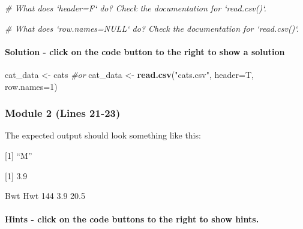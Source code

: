\documentclass[
]{article}
\newenvironment{Shaded}{\begin{snugshade}}{\end{snugshade}}
\newcommand{\CommentTok}[1]{\textcolor[rgb]{0.56,0.35,0.01}{\textit{#1}}}
\newcommand{\DataTypeTok}[1]{\textcolor[rgb]{0.13,0.29,0.53}{#1}}
\newcommand{\DecValTok}[1]{\textcolor[rgb]{0.00,0.00,0.81}{#1}}
\newcommand{\KeywordTok}[1]{\textcolor[rgb]{0.13,0.29,0.53}{\textbf{#1}}}
\newcommand{\NormalTok}[1]{#1}
\newcommand{\StringTok}[1]{\textcolor[rgb]{0.31,0.60,0.02}{#1}}
\begin{document}
\begin{Shaded}
\begin{Highlighting}[]
\CommentTok{# What does `header=F` do? Check the documentation for `read.csv()`.}
\end{Highlighting}
\end{Shaded}

\begin{Shaded}
\begin{Highlighting}[]
\CommentTok{# What does `row.names=NULL` do? Check the documentation for `read.csv()`.}
\end{Highlighting}
\end{Shaded}

\hypertarget{solution---click-on-the-code-button-to-the-right-to-show-a-solution}{%
\paragraph{Solution - click on the code button to the right to show a
solution}\label{solution---click-on-the-code-button-to-the-right-to-show-a-solution}}

\begin{Shaded}
\begin{Highlighting}[]
\NormalTok{cat_data <-}\StringTok{ }\NormalTok{cats }\CommentTok{#or}
\NormalTok{cat_data <-}\StringTok{ }\KeywordTok{read.csv}\NormalTok{(}\StringTok{"cats.csv"}\NormalTok{, }\DataTypeTok{header=}\NormalTok{T, }\DataTypeTok{row.names=}\DecValTok{1}\NormalTok{)}
\end{Highlighting}
\end{Shaded}

\hypertarget{module-2-lines-21-23}{%
\subsubsection{Module 2 (Lines 21-23)}\label{module-2-lines-21-23}}

The expected output should look something like this:

{[}1{]} ``M''

{[}1{]} 3.9

Bwt Hwt 144 3.9 20.5

\hypertarget{hints---click-on-the-code-buttons-to-the-right-to-show-hints.-1}{%
\paragraph{Hints - click on the code buttons to the right to show
hints.}\label{hints---click-on-the-code-buttons-to-the-right-to-show-hints.-1}}
\end{document}
